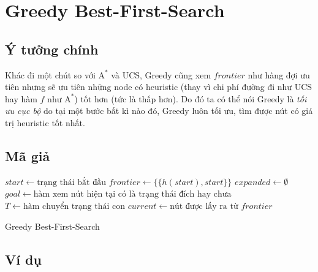 \section{Greedy Best-First-Search}

\subsection{Ý tưởng chính}

Khác đi một chút so với $\text{A}^*$ và UCS, Greedy cũng xem $frontier$ như hàng đợi ưu tiên nhưng sẽ ưu tiên những node có heuristic (thay vì chi phí đường đi như UCS hay hàm $f$ như $\text{A}^*$) tốt hơn (tức là thấp hơn). Do đó ta có thể nói Greedy là \textit{tối ưu cục bộ} do tại một bước bất kì nào đó, Greedy luôn tối ưu, tìm được nút có giá trị heuristic tốt nhất.

\newpage
\subsection{Mã giả}

\begin{algorithm}[H]
  $start \gets \text{trạng thái bắt đầu}$\;
  $frontier \gets \{\{h(start), start\}\}$\; 
  $expanded \gets \emptyset$\;
  $goal \gets \text{hàm xem nút hiện tại có là trạng thái đích hay chưa}$\;
  $T \gets \text{hàm chuyển trạng thái con}$\;
  {
      $current \gets \text{nút được lấy ra từ $frontier$}$\;
      \;
      {
        \;
      }{
        {
            {
                \;
            }
        }
      }
  }
  \;
  \caption{Greedy Best-First-Search}
  \label{algo:Greedy}
\end{algorithm}

\subsection{Ví dụ}


